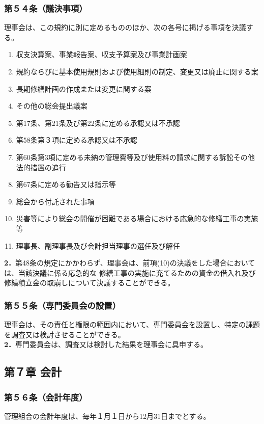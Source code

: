 \documentclass[12pt,uplatex,dvipdfmx]{jsarticle}
\begin{document}
\subsubsection*{第５４条（議決事項）}
理事会は、この規約に別に定めるもののほか、次の各号に掲げる事項を決議する。
\begin{enumerate}
\item 収支決算案、事業報告案、収支予算案及び事業計画案
\item 規約ならびに基本使用規則および使用細則の制定、変更又は廃止に関する案
\item 長期修繕計画の作成または変更に関する案
\item その他の総会提出議案
\item 第17条、第21条及び第22条に定める承認又は不承認
\item 第58条第３項に定める承認又は不承認
\item 第60条第3項に定める未納の管理費等及び使用料の請求に関する訴訟その他法的措置の追行
\item 第67条に定める勧告又は指示等
\item 総会から付託された事項
\item 災害等により総会の開催が困難である場合における応急的な修繕工事の実施等
\item 理事長、副理事長及び会計担当理事の選任及び解任
\end{enumerate}
\textbf{2．}第48条の規定にかかわらず、理事会は、前項(10)の決議をした場合においては、当該決議に係る応急的な
修繕工事の実施に充てるための資金の借入れ及び修繕積立金の取崩しについて決議することができる。
\subsubsection*{第５５条（専門委員会の設置）}
理事会は、その責任と権限の範囲内において、専門委員会を設置し、特定の課題を調査又は検討させることができる。\\
\textbf{2．}専門委員会は、調査又は検討した結果を理事会に具申する。

\begin{center}
\subsection*{第７章 会計}
\end{center}
\subsubsection*{第５６条（会計年度）}
管理組合の会計年度は、毎年１月１日から12月31日までとする。
\end{document}
